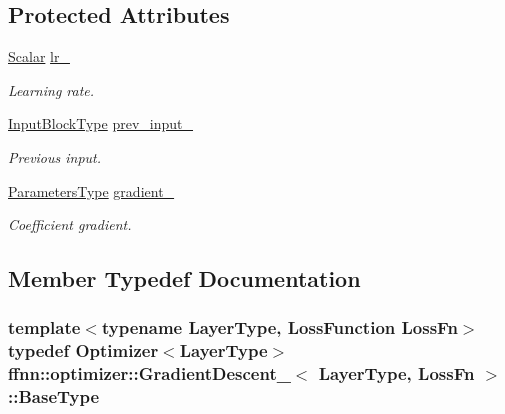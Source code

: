\subsection*{Protected Attributes}
\begin{DoxyCompactItemize}
\item 
\hyperlink{classffnn_1_1optimizer_1_1_gradient_descent___a9ea42179033176eb7686e00769034c8a}{Scalar} \hyperlink{classffnn_1_1optimizer_1_1_gradient_descent___a600bd6a5552e490da1b230c67a5e67d6}{lr\-\_\-}
\begin{DoxyCompactList}\small\item\em Learning rate. \end{DoxyCompactList}\item 
\hyperlink{classffnn_1_1optimizer_1_1_gradient_descent___a4870280152e25bf9a7622d52fa889b06}{Input\-Block\-Type} \hyperlink{classffnn_1_1optimizer_1_1_gradient_descent___a6a51e6729537c7de173ea53a27965415}{prev\-\_\-input\-\_\-}
\begin{DoxyCompactList}\small\item\em Previous input. \end{DoxyCompactList}\item 
\hyperlink{classffnn_1_1optimizer_1_1_gradient_descent___ae5ad0804c042e40a0a0ac64ae34fdc85}{Parameters\-Type} \hyperlink{classffnn_1_1optimizer_1_1_gradient_descent___a47f75b7c806bdd2bd254c147a35e3ae2}{gradient\-\_\-}
\begin{DoxyCompactList}\small\item\em Coefficient gradient. \end{DoxyCompactList}\end{DoxyCompactItemize}


\subsection{Member Typedef Documentation}
\hypertarget{classffnn_1_1optimizer_1_1_gradient_descent___a0d078c334d4cdebc587ac45ceb16cf8c}{
\subsubsection[{Base\-Type}]{\setlength{\rightskip}{0pt plus 5cm}template$<$typename Layer\-Type, Loss\-Function Loss\-Fn$>$ typedef {\bf Optimizer}$<$Layer\-Type$>$ {\bf ffnn\-::optimizer\-::\-Gradient\-Descent\-\_\-}$<$ Layer\-Type, Loss\-Fn $>$\-::{\bf Base\-Type}}}\label{classffnn_1_1optimizer_1_1_gradient_descent___a0d078c334d4cdebc587ac45ceb16cf8c}


